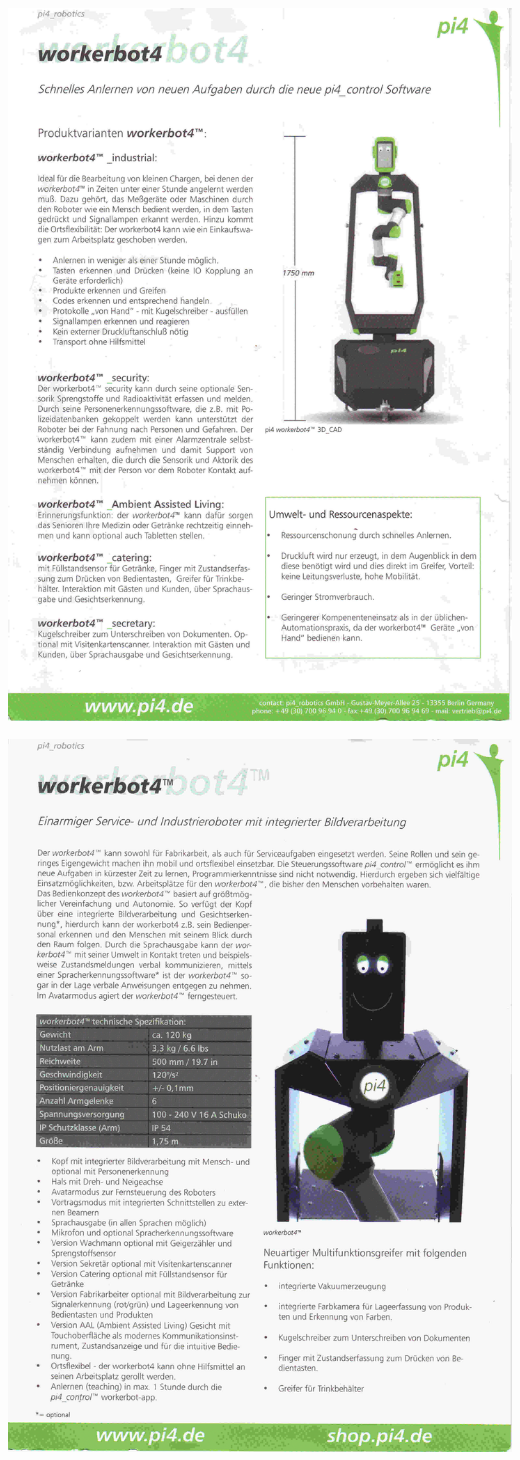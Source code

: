    \includegraphics[scale=0.75]{img/jolandi1.jpg} 
   
   \includegraphics[scale=0.75]{img/jolandi2.jpg} 


